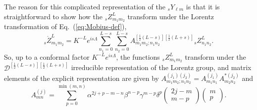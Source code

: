 \documentclass[11pt]{article}
\begin{document}
The reason for this complicated representation of the ${}_sY_{\ell m}$
is that it is straightforward to show how the ${}_sZ^L_{m_1m_2}$
transform under the Lorentz transformation of Eq.~(\ref{eq:Mobius-def}),
\begin{equation}
{}_s\acute{Z}^L_{m_1m_2} = K^{-L}e^{is\Lambda}
    \sum_{n_1=0}^{L-s}{\sum_{n_2=0}^{L-s}{
        A^{[\frac12(L-s)][\frac12(L+s)]}_{m_1m_2;n_1n_2}{}_sZ^L_{n_1n_2}}}.
\end{equation}
So, up to a conformal factor $K^{-L}e^{is\Lambda}$, the functions
${}_sZ^L_{m_1m_2}$ transform under the
$\mathcal{D}^{[\frac12(L-s)][\frac12(L+s)]}$ irreducible
representation of the Lorentz group, and matrix elements of the
explicit representation are given by
$A^{(j_1)(j_2)}_{m_1m_2;n_1n_2}=A^{(j_1)}_{m_1n_1}A^{*(j_2)}_{m_2n_2}$
and
\begin{equation}
  A^{(j)}_{mn}=\sum_{p=0}^{\min(m,n)}{
    \alpha^{2j+p-m-n}\beta^{n-p}\gamma^{m-p}\delta^p
      \left(\begin{array}{c}2j-m \\ m-p\end{array}\right)
      \left(\begin{array}{c}m \\ p\end{array}\right)}.
\end{equation}
\end{document}
